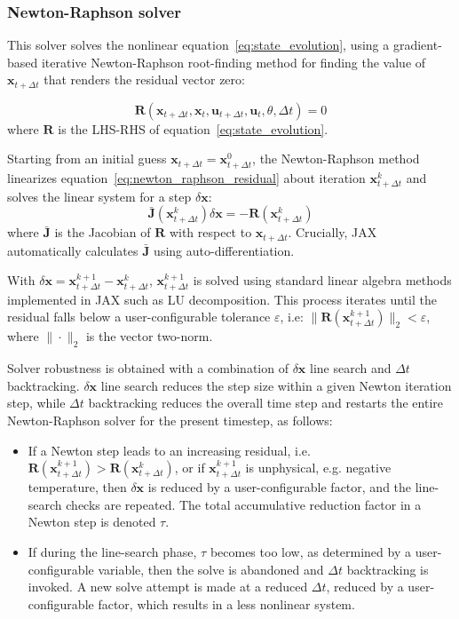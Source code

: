 \documentclass[aps, reprint, nofootinbib]{revtex4-2}
\begin{document}
\subsubsection{Newton-Raphson solver}
This solver solves the nonlinear equation~\ref{eq:state_evolution}, using a gradient-based iterative Newton-Raphson root-finding method for finding the value of $\mathbf{x}_{t+\Delta t}$ that renders the residual vector zero:

\begin{equation}
\label{eq:newton_raphson_residual}
\mathbf{R}(\mathbf{x}_{t+\Delta t},\mathbf{x}_t,\mathbf{u}_{t+\Delta t},\mathbf{u}_t, \theta, \Delta t) = 0
\end{equation}
where $\mathbf{R}$ is the LHS-RHS of equation~\ref{eq:state_evolution}.

Starting from an initial guess $\mathbf{x}_{t+\Delta t}=\mathbf{x}_{t+\Delta t}^0$, the Newton-Raphson method linearizes equation~\ref{eq:newton_raphson_residual} about iteration $\mathbf{x}_{t+\Delta t}^k$ and solves the linear system for a step $\delta\mathbf{x}$:
\begin{equation}
\label{eq:newton_raphson_step}
\mathbf{\bar{J}}(\mathbf{x}_{t+\Delta t}^k) \delta\mathbf{x} = -\mathbf{R}(\mathbf{x}_{t+\Delta t}^k)
\end{equation}
where $\mathbf{\bar{J}}$ is the Jacobian of $\mathbf{R}$ with respect to $\mathbf{x}_{t+\Delta t}$. Crucially, JAX automatically calculates $\mathbf{\bar{J}}$ using auto-differentiation.

With $\delta\mathbf{x} = \mathbf{x}_{t+\Delta t}^{k+1} - \mathbf{x}_{t+\Delta t}^{k}$, $\mathbf{x}_{t+\Delta t}^{k+1}$ is solved using standard linear algebra methods implemented in JAX such as LU decomposition. This process iterates until the residual falls below a user-configurable tolerance $\varepsilon$,  i.e: $\| \mathbf{R}(\mathbf{x}_{t+\Delta t}^{k+1}) \|_2 < \varepsilon$, where $\|\cdot\|_2$ is the vector two-norm.

Solver robustness is obtained with a combination of $\delta \mathbf{x}$ line search and $\Delta t$ backtracking. $\delta \mathbf{x}$ line search reduces the step size within a given Newton iteration step, while $\Delta t$ backtracking reduces the overall time step and restarts the entire Newton-Raphson solver for the present timestep, as follows:
\begin{itemize}
    \item If a Newton step leads to an increasing residual, i.e. $\mathbf{R}(\mathbf{x}_{t+\Delta t}^{k+1}) > \mathbf{R}(\mathbf{x}_{t+\Delta t}^k)$, or if $\mathbf{x}_{t+\Delta t}^{k+1}$ is unphysical, e.g. negative temperature, then $\delta \mathbf{x}$ is reduced by a user-configurable factor, and the line-search checks are repeated. The total accumulative reduction factor in a Newton step is denoted $\tau$.
    \item If during the line-search phase, $\tau$ becomes too low, as determined by a user-configurable variable, then the solve is abandoned and $\Delta t$ backtracking is invoked. A new solve attempt is made at a reduced $\Delta t$, reduced by a user-configurable factor, which results in a less nonlinear system.
\end{itemize}
\end{document}
